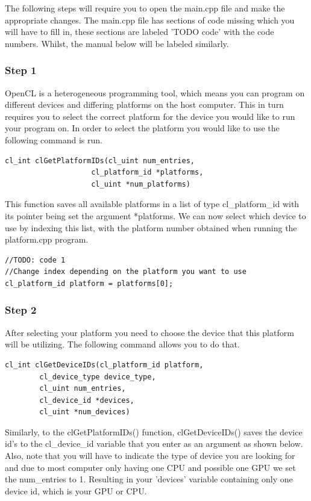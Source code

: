 The following steps will require you to open the main.cpp file and make the appropriate changes. The main.cpp file has sections of code missing which you will have to fill in, these sections are labeled 'TODO code' with the code numbers. Whilst, the manual below will be labeled similarly.
\subsubsection{Step 1}
OpenCL is a heterogeneous programming tool, which means you can program on different devices and differing platforms on the host computer. This in turn requires you to select the correct platform for the device you would like to run your program on. In order to select the platform you would like to use the following command is run. 

\begin{lstlisting}
cl_int clGetPlatformIDs(cl_uint num_entries,
					cl_platform_id *platforms, 
					cl_uint *num_platforms)
\end{lstlisting}

This function saves all available platforms in a list of type cl\_platform\_id with its pointer being set the argument *platforms. We can now select which device to use by indexing this list, with the platform number obtained when running the platform.cpp program. 

\begin{lstlisting}
//TODO: code 1
//Change index depending on the platform you want to use
cl_platform_id platform = platforms[0]; 
\end{lstlisting}

\subsubsection{Step 2}
After selecting your platform you need to choose the device that this platform will be utilizing. The following command allows you to do that.

\begin{lstlisting}
cl_int clGetDeviceIDs(cl_platform_id platform,
		cl_device_type device_type, 
		cl_uint num_entries, 
		cl_device_id *devices, 
		cl_uint *num_devices)
\end{lstlisting}
Similarly, to the clGetPlatformIDs() function, clGetDeviceIDs() saves the device id's to the cl\_device\_id variable that you enter as an argument as shown below. Also, note that you will have to indicate the type of device you are looking for and due to most computer only having one CPU and possible one GPU we set the num\_entries to 1. Resulting in your 'devices' variable containing only one device id, which is your GPU or CPU.

